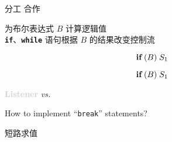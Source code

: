 
\begin{frame}{}
  \begin{center}
    {\Large 分工 \qquad 合作}

    \vspace{0.20cm}
  \end{center}

  \begin{center}
    为布尔表达式 $B$ 计算逻辑值 \\[5pt]
    \texttt{\bf if}、\texttt{\bf while} 语句根据 $B$
    的结果改变控制流
  \end{center}

  \vspace{-0.30cm}
  \[
    \texttt{\bf if}\; (B)\; S_{1}
  \]
\end{frame}

\begin{frame}{}
\end{frame}

\begin{frame}{}
\end{frame}

\begin{frame}
  \[
    \texttt{\bf if}\; (B)\; S_{1}
  \]

  \vspace{1.00cm}
  \begin{center}
    \textcolor<2->{lightgray}{\bf Listener} \pause \emph{vs.} 
  \end{center}
\end{frame}

\begin{frame}
  \begin{center}

    How to implement ``\texttt{break}'' statements?
  \end{center}
\end{frame}

\begin{frame}
  \begin{center}
    短路求值
  \end{center}
\end{frame}

\begin{frame}
\end{frame}

\begin{frame}{}
\end{frame}
